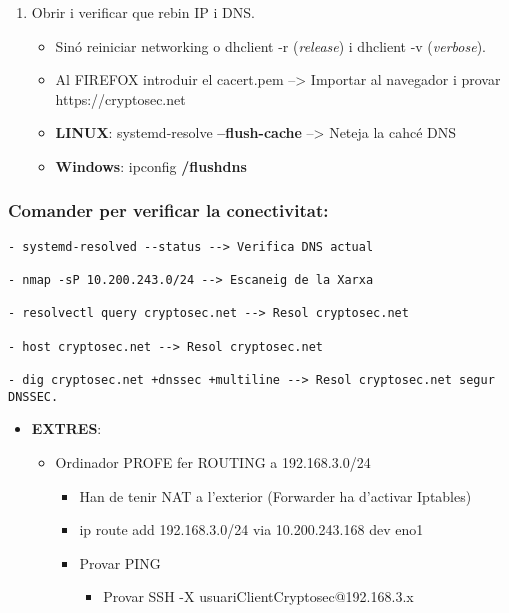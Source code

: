 \documentclass[]{article}
\providecommand{\tightlist}{%
  \setlength{\itemsep}{0pt}\setlength{\parskip}{0pt}}
\begin{document}
\begin{enumerate}
\def\labelenumi{\arabic{enumi}.}
\item
  Obrir i verificar que rebin IP i DNS.

  \begin{itemize}
  \item
    Sinó reiniciar networking o dhclient -r (\emph{release}) i dhclient
    -v (\emph{verbose}).
  \item
    Al FIREFOX introduir el cacert.pem --\textgreater{} Importar al
    navegador i provar https://cryptosec.net
  \item
    \textbf{LINUX}: systemd-resolve \textbf{--flush-cache}
    --\textgreater{} Neteja la cahcé DNS
  \item
    \textbf{Windows}: ipconfig \textbf{/flushdns}
  \end{itemize}
\end{enumerate}

\hypertarget{comander-per-verificar-la-conectivitat}{%
\subsubsection{\texorpdfstring{\textbf{Comander per verificar la
conectivitat}:}{Comander per verificar la conectivitat:}}\label{comander-per-verificar-la-conectivitat}}

\begin{verbatim}
- systemd-resolved --status --> Verifica DNS actual

- nmap -sP 10.200.243.0/24 --> Escaneig de la Xarxa

- resolvectl query cryptosec.net --> Resol cryptosec.net

- host cryptosec.net --> Resol cryptosec.net

- dig cryptosec.net +dnssec +multiline --> Resol cryptosec.net segur DNSSEC.
\end{verbatim}

\begin{itemize}
\item
  \textbf{EXTRES}:

  \begin{itemize}
  \item
    Ordinador PROFE fer ROUTING a 192.168.3.0/24

    \begin{itemize}
    \item
      Han de tenir NAT a l'exterior (Forwarder ha d'activar Iptables)
    \item
      ip route add 192.168.3.0/24 via 10.200.243.168 dev eno1
    \item
      Provar PING

      \begin{itemize}
      \tightlist
      \item
        Provar SSH -X usuariClientCryptosec@192.168.3.x
      \end{itemize}
    \end{itemize}
  \end{itemize}
\end{itemize}
\end{document}
